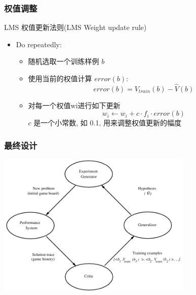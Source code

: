 \documentclass{beamer}
\begin{document}
\begin{frame}
\frametitle{权值调整}
\label{sec-4-8}

LMS 权值更新法则(LMS Weight update rule)
\begin{itemize}
\item Do repeatedly:
\begin{itemize}
\item 随机选取一个训练样例 $b$
\item 使用当前的权值计算 $error(b)$:
         \[error(b) = V_{train}(b) - \hat{V}(b)\]
\item 对每一个权值wi进行如下更新
          \[w_{i} \leftarrow w_{i} + c \cdot f_{i} \cdot error(b) \]
      $c$ 是一个小常数, 如 0.1, 用来调整权值更新的幅度
\end{itemize}
\end{itemize}
\end{frame}
\begin{frame}
\frametitle{最终设计}
\label{sec-4-9}

\center
\includegraphics[width=0.7\textwidth]{./image/intro-final-design.png}
\end{frame}
\end{document}
